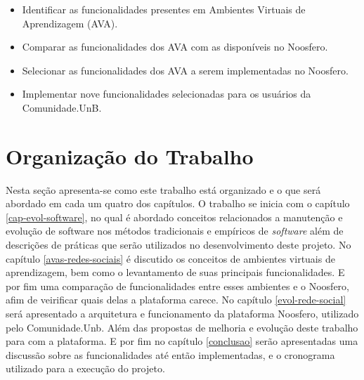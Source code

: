 \begin{itemize}
\item Identificar as funcionalidades presentes em Ambientes Virtuais de Aprendizagem (AVA).
\item Comparar as funcionalidades dos AVA com as disponíveis no Noosfero.
\item Selecionar as funcionalidades dos AVA a serem implementadas no Noosfero.
\item Implementar nove funcionalidades selecionadas para os usuários da Comunidade.UnB.
\end{itemize}

\section{Organização do Trabalho}

Nesta seção apresenta-se como este trabalho está organizado e o que será abordado em cada um quatro dos capítulos. O trabalho se inicia com o capítulo \ref{cap-evol-software}, no qual é abordado conceitos relacionados a manutenção e evolução de software nos métodos tradicionais e empíricos de \textit{software} além de descrições de práticas que serão utilizados no desenvolvimento deste projeto. No capítulo \ref{avas-redes-sociais} é discutido os conceitos de ambientes virtuais de aprendizagem, bem como o levantamento de suas principais funcionalidades. E por fim uma comparação de funcionalidades entre esses ambientes e o Noosfero, afim de veirificar quais delas a plataforma carece. No capítulo \ref{evol-rede-social} será apresentado a arquitetura e funcionamento da plataforma Noosfero, utilizado pelo Comunidade.Unb. Além das propostas de melhoria e evolução deste trabalho para com a plataforma. E por fim no capítulo \ref{conclusao} serão apresentadas uma discussão sobre as funcionalidades até então implementadas, e o cronograma utilizado para a execução do projeto.